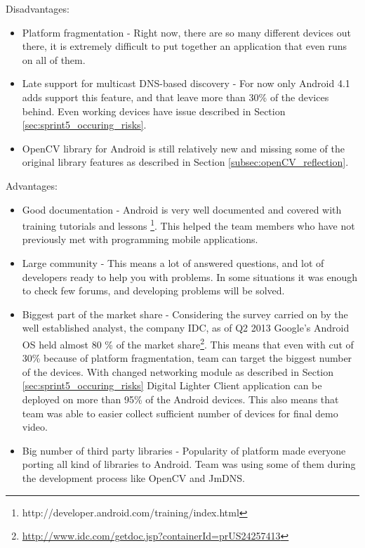 Disadvantages:
\begin{itemize}
\item Platform fragmentation - Right now, there are so many different devices out there, it is extremely difficult to put together an application that even runs on all of them.
\item Late support for multicast DNS-based discovery - For now only Android 4.1 adds support this feature, and that leave more than 30\% of the devices behind. Even working devices have issue described in Section \ref{sec:sprint5_occuring_risks}.
\item OpenCV library for Android is still relatively new and missing some of the original library features as described in Section \ref{subsec:openCV_reflection}.
\end{itemize}

Advantages:
\begin{itemize}
\item Good documentation - Android is very well documented and covered with training tutorials and lessons \footnote{http://developer.android.com/training/index.html}. This helped the team members who have not previously met with programming mobile applications. 

\item Large community - This means a lot of answered questions, and lot of developers ready to help you with problems. In some situations it was enough to check few forums, and developing problems will be solved.

\item Biggest part of the market share - Considering the survey carried on by the well established analyst, the company IDC, as of Q2 2013 Google's Android OS held almost 80 \% of the market share\footnote{\url{http://www.idc.com/getdoc.jsp?containerId=prUS24257413}}. This means that even with cut of 30\% because of platform fragmentation, team can target the biggest number of the devices. With changed networking module as described in Section \ref{sec:sprint5_occuring_risks} Digital Lighter Client application can be deployed on more than 95\% of the Android devices. This also means that team was able to easier collect sufficient number of devices for final demo video.

\item Big number of third party libraries - Popularity of platform made everyone porting all kind of libraries to Android. Team was using some of them during the development process like OpenCV and JmDNS. 
\end{itemize}

